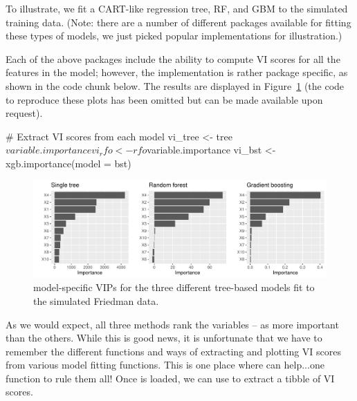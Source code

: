To illustrate, we fit a CART-like regression tree, RF, and GBM to the simulated training data. (Note: there are a number of different packages available for fitting these types of models, we just picked popular implementations for illustration.)


Each of the above packages include the ability to compute VI scores for all the features in the model; however, the implementation is rather package specific, as shown in the code chunk below. The results are displayed in Figure~\ref{fig:vi-plots} (the code to reproduce these plots has been omitted but can be made available upon request).

\begin{example}
# Extract VI scores from each model
vi_tree <- tree$variable.importance
vi_rfo <- rfo$variable.importance
vi_bst <- xgb.importance(model = bst)
\end{example}

\begin{figure}[!htb]
  \centering 
  \includegraphics[width=1\linewidth]{figures/vi-plots} 
  \caption{model-specific VIPs for the three different tree-based models fit to the simulated Friedman data.}
  \label{fig:vi-plots}
\end{figure}

As we would expect, all three methods rank the variables -- as more important than the others. While this is good news, it is unfortunate that we have to remember the different functions and ways of extracting and plotting VI scores from various model fitting functions. This is one place where  can help...one function to rule them all! Once  is loaded, we can use  to extract a tibble of VI scores.

